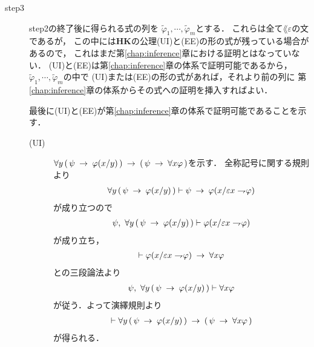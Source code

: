 \begin{description}
		\item[step3]
			step2の終了後に得られる式の列を
			$\tilde{\varphi}_{1},\cdots,\tilde{\varphi}_{m}$とする．
			これらは全て$\lang{\varepsilon}$の文であるが，
			この中には{\bf HK}の公理(UI)と(EE)の形の式が残っている場合があるので，
			これはまだ第\ref{chap:inference}章における証明とはなっていない．
			(UI)と(EE)は第\ref{chap:inference}章の体系で証明可能であるから，
			$\tilde{\varphi}_{1},\cdots,\tilde{\varphi}_{m}$の中で
			(UI)または(EE)の形の式があれば，それより前の列に
			第\ref{chap:inference}章の体系からその式への証明を挿入すればよい．
			
			最後に(UI)と(EE)が第\ref{chap:inference}章の体系で証明可能であることを示す．
			
			\begin{description}
				\item[(UI)]
					$\forall y\, (\, \psi \hspace{0.25em}\rightarrow\hspace{0.25em} \varphi(x/y)\, ) 
					\hspace{0.25em}\rightarrow\hspace{0.25em} (\, \psi \hspace{0.25em}\rightarrow\hspace{0.25em} \forall x \varphi\, )$を示す．
					全称記号に関する規則より
					\begin{align}
						\forall y\, (\, \psi \hspace{0.25em}\rightarrow\hspace{0.25em} \varphi(x/y)\, ) \vdash 
						\psi \hspace{0.25em}\rightarrow\hspace{0.25em} \varphi(x/\varepsilon x \rightharpoondown\hspace{-0.25em} \varphi)
					\end{align}
					が成り立つので
					\begin{align}
						\psi,\ \forall y\, (\, \psi \hspace{0.25em}\rightarrow\hspace{0.25em} \varphi(x/y)\, ) \vdash 
						\varphi(x/\varepsilon x \rightharpoondown\hspace{-0.25em} \varphi)
					\end{align}
					が成り立ち，
					\begin{align}
						\vdash \varphi(x/\varepsilon x \rightharpoondown\hspace{-0.25em} \varphi)
						\hspace{0.25em}\rightarrow\hspace{0.25em} \forall x \varphi
					\end{align}
					との三段論法より
					\begin{align}
						\psi,\ \forall y\, (\, \psi \hspace{0.25em}\rightarrow\hspace{0.25em} \varphi(x/y)\, ) \vdash
						\forall x \varphi
					\end{align}
					が従う．よって演繹規則より
					\begin{align}
						\vdash \forall y\, (\, \psi \hspace{0.25em}\rightarrow\hspace{0.25em} \varphi(x/y)\, )
						\hspace{0.25em}\rightarrow\hspace{0.25em} (\, \psi \hspace{0.25em}\rightarrow\hspace{0.25em} \forall x \varphi\, )
					\end{align}
					が得られる．
					\QED
					

\end{description}
\end{description}
